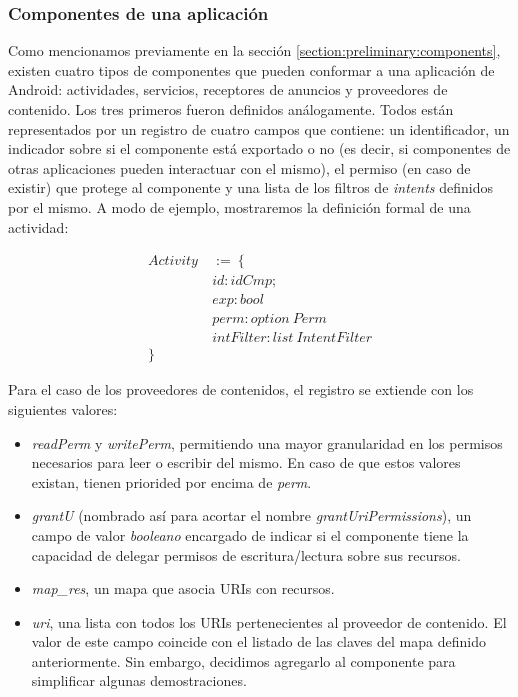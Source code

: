 \subsubsection*{Componentes de una aplicación}
Como mencionamos previamente en la sección \ref{section:preliminary:components}, existen cuatro
tipos de componentes que pueden conformar a una aplicación de Android: actividades, servicios,
receptores de anuncios y proveedores de contenido. Los tres primeros fueron definidos análogamente.
Todos están representados por un registro de cuatro campos que contiene: un identificador, un
indicador sobre si el componente está exportado o no (es decir, si componentes de otras aplicaciones
pueden interactuar con el mismo), el permiso (en caso de existir) que protege al componente y una
lista de los filtros de \textit{intents} definidos por el mismo. A modo de ejemplo, mostraremos la
definición formal de una actividad:

\begin{align*}
    Activity\  & :=\ \{                        \\
               & id: idCmp;                    \\
               & exp: bool                     \\
               & perm: option\ Perm            \\
               & intFilter: list\ IntentFilter \\
    \}
\end{align*}

Para el caso de los proveedores de contenidos, el registro se extiende con los siguientes valores:

\begin{itemize}
    \item \textit{readPerm} y \textit{writePerm}, permitiendo una mayor granularidad en los permisos
          necesarios para leer o escribir del mismo. En caso de que estos valores existan, tienen
          priorided por encima de \textit{perm}.
    \item \textit{grantU} (nombrado así para acortar el nombre \textit{grantUriPermissions}), un
          campo de valor \textit{booleano} encargado de indicar si el componente tiene la capacidad
          de delegar permisos de escritura/lectura sobre sus recursos.
    \item \textit{map\_res}, un mapa que asocia URIs con recursos.
    \item \textit{uri}, una lista con todos los URIs pertenecientes al proveedor de contenido. El
          valor de este campo coincide con el listado de las claves del mapa definido anteriormente.
          Sin embargo, decidimos agregarlo al componente para simplificar algunas demostraciones.
\end{itemize}


